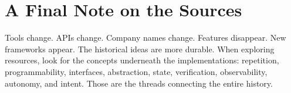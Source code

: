 \documentclass[11pt,twoside]{book}
\begin{document}
\section*{A Final Note on the Sources}
Tools change. APIs change. Company names change. Features disappear. New frameworks appear.
The historical ideas are more durable. When exploring resources, look for the concepts underneath the implementations: repetition, programmability, interfaces, abstraction, state, verification, observability, autonomy, and intent. Those are the threads connecting the entire history.
\end{document}
